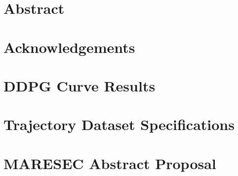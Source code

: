 \documentclass[12pt]{scrartcl}
\begin{document}

\section*{Abstract}

\newpage
\section*{Acknowledgements}

\newpage
\tableofcontents
\newpage

\listoffigures
\listoftables
\newpage
\noindent



\newpage


\newpage

\appendix
\section{DDPG Curve Results} \label{appendix:curveResults}

\section{Trajectory Dataset Specifications}\label{appendix:datasets}


\section{MARESEC Abstract Proposal}\label{appendix:maresec}



\end{document}
